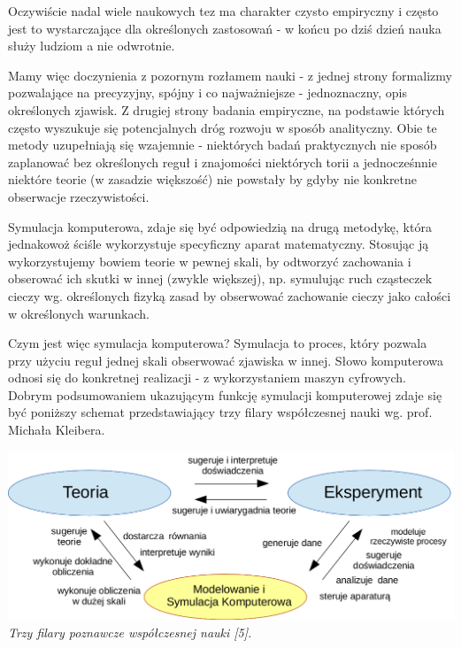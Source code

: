 \par{
Oczywiście nadal wiele naukowych tez ma charakter czysto empiryczny i często jest to wystarczające dla określonych zastosowań - w końcu po dziś dzień nauka służy ludziom a nie odwrotnie.
}

\par{
Mamy więc doczynienia z pozornym rozłamem nauki - z jednej strony formalizmy pozwalające na precyzyjny, spójny i co najważniejsze - jednoznaczny, opis określonych zjawisk. Z drugiej strony badania empiryczne, na podstawie których często wyszukuje się potencjalnych dróg rozwoju w sposób analityczny. Obie te metody uzupełniają się wzajemnie - niektórych badań praktycznych nie sposób zaplanować bez określonych reguł i znajomości niektórych torii a jednocześnnie niektóre teorie (w zasadzie większość) nie powstały by gdyby nie konkretne obserwacje rzeczywistości.
}

\par{
Symulacja komputerowa, zdaje się być odpowiedzią na drugą metodykę, która jednakowoż ściśle wykorzystuje specyficzny aparat matematyczny. Stosując ją wykorzystujemy bowiem teorie w pewnej skali, by odtworzyć zachowania i obserować ich skutki w innej (zwykle większej), np. symulując ruch cząsteczek cieczy wg. określonych fizyką zasad by obserwować zachowanie cieczy jako całości w określonych warunkach.
}

\par{
Czym jest więc symulacja komputerowa? Symulacja to proces, który pozwala przy użyciu reguł jednej skali obserwować zjawiska w innej. Słowo komputerowa odnosi się do konkretnej realizacji - z wykorzystaniem maszyn cyfrowych. Dobrym podsumowaniem ukazującym funkcję symulacji komputerowej zdaje się być poniższy schemat przedstawiający trzy filary współczesnej nauki wg. prof. Michała Kleibera.
\begin{center}
\includegraphics[width=\textwidth,keepaspectratio]{img/triada_poznania}
\textit{Trzy filary poznawcze współczesnej nauki [5].}
\end{center}
}

